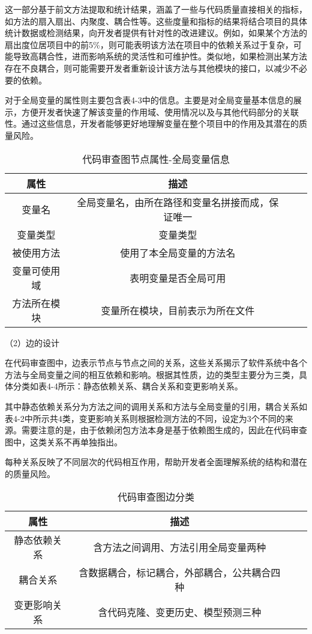 这一部分基于前文方法提取和统计结果，涵盖了一些与代码质量直接相关的指标，如方法的扇入扇出、内聚度、耦合性等。这些度量和指标的结果将结合项目的具体统计数据或检测结果，向开发者提供有针对性的改进建议。例如，如果某个方法的扇出度位居项目中的前5\%，则可能表明该方法在项目中的依赖关系过于复杂，可能导致高耦合性，进而影响系统的灵活性和可维护性。类似地，如果检测出某方法存在不良耦合，则可能需要开发者重新设计该方法与其他模块的接口，以减少不必要的依赖。



对于全局变量的属性则主要包含表4-3中的信息。主要是对全局变量基本信息的展示，方便开发者快速了解该变量的作用域、使用情况以及与其他代码部分的关联性。通过这些信息，开发者能够更好地理解变量在整个项目中的作用及其潜在的质量风险。

\begin{table}[htbp]
\caption{代码审查图节点属性-全局变量信息}
\vspace{0.5em}\centering\wuhao
\begin{tabular}{cccc}
\toprule
    属性 & 描述 \\
\midrule
变量名 & 全局变量名，由所在路径和变量名拼接而成，保证唯一  \\
变量类型 & 变量类型   \\
被使用方法 & 使用了本全局变量的方法名   \\
变量可使用域 & 表明变量是否全局可用   \\
方法所在模块 &  变量所在模块，目前表示为所在文件  \\  
\bottomrule
\end{tabular}
\end{table}


（2）边的设计

在代码审查图中，边表示节点与节点之间的关系，这些关系揭示了软件系统中各个方法与全局变量之间的相互依赖和影响。根据其性质，边的类型主要分为三类，具体分类如表4-4所示：静态依赖关系、耦合关系和变更影响关系。

其中静态依赖关系分为方法之间的调用关系和方法与全局变量的引用，耦合关系如表4-2中所示共4类，变更影响关系则根据检测方法的不同，设定为3个不同的来源。需要注意的是，由于依赖闭包方法本身是基于依赖图生成的，因此在代码审查图中，这类关系不再单独指出。

每种关系反映了不同层次的代码相互作用，帮助开发者全面理解系统的结构和潜在的质量风险。

\begin{table}[htbp]
\caption{代码审查图边分类}
\vspace{0.5em}\centering\wuhao
\begin{tabular}{cccc}
\toprule
属性 & 描述 \\
\midrule
静态依赖关系 & 含方法之间调用、方法引用全局变量两种  \\
耦合关系 & 含数据耦合，标记耦合，外部耦合，公共耦合四种   \\
变更影响关系 & 含代码克隆、变更历史、模型预测三种  \\
\bottomrule
\end{tabular}
\end{table}



